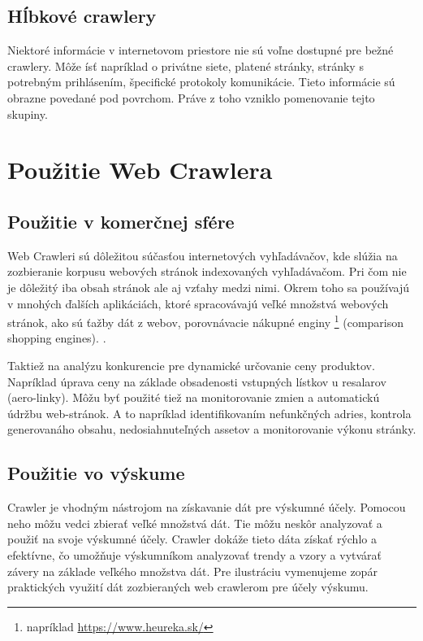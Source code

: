 \subsection{Hĺbkové crawlery}
Niektoré informácie v internetovom priestore nie sú voľne dostupné pre bežné crawlery. Môže ísť napríklad o privátne siete, platené stránky, stránky s potrebným prihlásením, špecifické protokoly komunikácie. Tieto informácie sú obrazne povedané pod povrchom. Práve z toho vzniklo pomenovanie tejto skupiny. 

\section{Použitie Web Crawlera}

\subsection{Použitie v komerčnej sfére}
Web Crawleri sú dôležitou súčasťou internetových vyhľadávačov, kde slúžia na zozbieranie korpusu webových stránok indexovaných vyhľadávačom. Pri čom nie je dôležitý iba obsah stránok ale aj vzťahy medzi nimi. Okrem toho sa používajú v mnohých ďalších aplikáciách, ktoré spracovávajú veľké množstvá webových stránok, ako sú ťažby dát z webov, porovnávacie nákupné enginy \footnote{ napríklad \url{https://www.heureka.sk/}} (comparison shopping engines). \cite{encykOfDatabases}.  

Taktiež na analýzu konkurencie pre dynamické určovanie ceny produktov. Napríklad úprava ceny na základe obsadenosti vstupných lístkov u resalarov (aero-linky). 
Môžu byť použité tiež na monitorovanie zmien a automatickú údržbu web-stránok. A to napríklad identifikovaním nefunkčných adries, kontrola generovanáho obsahu, nedosiahnuteľných assetov a monitorovanie výkonu stránky. \cite{crawlPageTesting}

\subsection{Použitie vo výskume}
Crawler je vhodným nástrojom na získavanie dát pre výskumné účely. Pomocou neho môžu vedci zbierať veľké množstvá dát. Tie môžu neskôr analyzovať a použiť na svoje výskumné účely. Crawler dokáže tieto dáta získať rýchlo a efektívne, čo umožňuje výskumníkom analyzovať trendy a vzory a vytvárať závery na základe veľkého množstva dát. Pre ilustráciu vymenujeme zopár praktických využití dát zozbieraných web crawlerom pre účely výskumu. 

